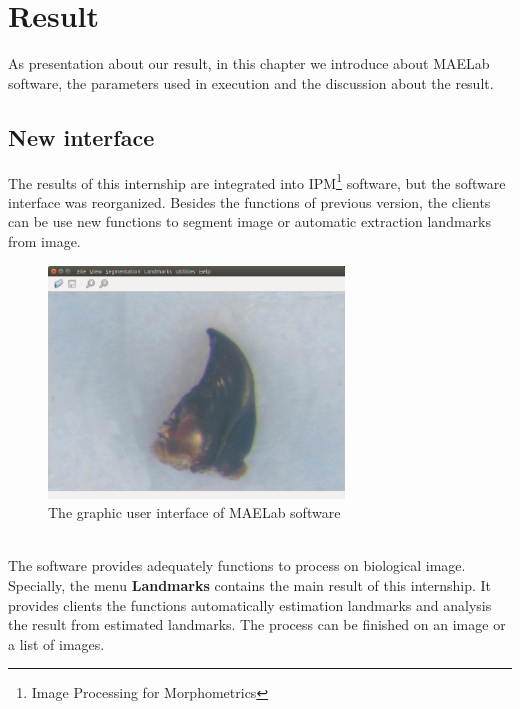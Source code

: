 \section{Result}
As presentation about our result, in this chapter we introduce about MAELab software, the parameters used in execution and the discussion about the result.
\subsection{New interface}
The results of this internship are integrated into IPM\footnote{Image Processing for Morphometrics} software, but the software interface was reorganized. Besides the functions of previous version, the clients can be use new functions to segment image or automatic extraction landmarks from image.
\begin{figure}[h!]
\centering
\includegraphics[width=0.7\textwidth]{./images/software}
\caption{The graphic user interface of MAELab software}
\label{fig:figure_31}
\end{figure}~\\
The software provides adequately functions to process on biological image. Specially, the menu \textbf{Landmarks} contains the main result of this internship. It provides clients the functions automatically estimation landmarks and analysis the result from estimated landmarks. The process can be finished on an image or a list of images.
